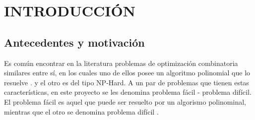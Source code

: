 
\chapter{INTRODUCCIÓN}
\label{cap:intro}




\section{Antecedentes y motivación}
\label{intro:motivacion}

Es común encontrar en la literatura problemas de optimización combinatoria similares entre sí, en los cuales uno de ellos posee un algoritmo polinomial que lo resuelve \citep{papadimitriou1982combinatorial}. y el otro es del tipo NP-Hard. A un par de problemas que tienen estas características, en este proyecto se les denomina problema fácil - problema difícil. El problema fácil es aquel que puede ser resuelto por un algorismo polinominal, mientras que el otro se denomina problema difícil \citep{cook1995combinatorial}. 

